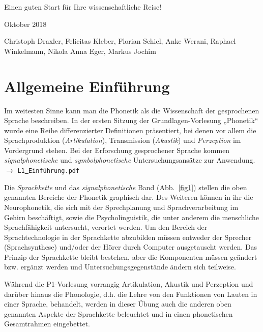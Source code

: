 \documentclass[11pt]{book}
\begin{document}
Einen guten Start für Ihre wissenschaftliche Reise!

\begin {flushright} 
Oktober 2018
\end{flushright}
Christoph Draxler, Felicitas Kleber, Florian Schiel, Anke Werani, Raphael Winkelmann, Nikola Anna Eger, Markus Jochim





\chapter{Allgemeine Einführung}

Im weitesten Sinne kann man die Phonetik als die Wissenschaft der gesprochenen Sprache beschreiben. In der ersten Sitzung der Grundlagen-Vorlesung „Phonetik“ wurde eine Reihe differenzierter Definitionen präsentiert, bei denen vor allem die Sprachproduktion (\textit{Artikulation}), Transmission (\textit{Akustik}) und \textit{Perzeption} im Vordergrund stehen. Bei der Erforschung gesprochener Sprache kommen \textit{signalphonetische} und \textit{symbolphonetische} Untersuchungsansätze zur Anwendung. $\rightarrow$ {\tt L1\underline{\ }Einführung.pdf} 

Die \textit{Sprachkette} und das \textit{signalphonetische} Band (Abb.~\ref{fig1}) stellen die oben genannten Bereiche der Phonetik graphisch dar. Des Weiteren können in ihr die Neurophonetik, die sich mit der Sprechplanung und Sprachverarbeitung im Gehirn beschäftigt, sowie die Psycholinguistik, die unter anderem die menschliche Sprachfähigkeit untersucht, verortet werden.  Um den Bereich der Sprachtechnologie in der Sprachkette abzubilden müssen entweder der Sprecher (Sprachsynthese) und/oder der Hörer durch Computer   ausgetauscht werden. Das Prinzip der Sprachkette bleibt bestehen, aber die Komponenten müssen geändert bzw. ergänzt werden und Untersuchungsgegenstände ändern sich teilweise.

Während die P1-Vorlesung vorrangig Artikulation, Akustik und Perzeption und darüber hinaus die Phonologie, d.\thinspace h. die Lehre von den Funktionen von Lauten in einer Sprache, behandelt, werden in dieser Übung auch die anderen oben genannten Aspekte der Sprachkette beleuchtet und in einen phonetischen Gesamtrahmen eingebettet.
\end{document}
